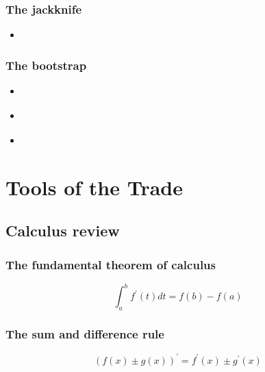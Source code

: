 \documentclass{report}
\begin{document}
\subsection{The jackknife}

\begin{itemize}
    \item \cite[Chapter~30]{dasgupta_asymptotic_2008}
\end{itemize}

\subsection{The bootstrap}

\begin{itemize}
    \item \cite[Chapter~23]{van_der_vaart_asymptotic_1998}
    \item \cite[Chapter~29]{dasgupta_asymptotic_2008}
    \item \cite[Chapter~10.1]{casella_statistical_2002}
\end{itemize}


\chapter{Tools of the Trade} \label{chap:tools-of-the-trade}

\section{Calculus review}\label{sec:tools-calculus}

\subsection{The fundamental theorem of calculus}

\begin{equation}\label{eq:fundamental-theorem-of-calculus}
    \int_a^b f^\prime(t) dt = f(b) - f(a)
\end{equation}

\subsection{The sum and difference rule}

\begin{equation}\label{eq:sum-and-difference-rule}
    (f(x) \pm g(x))^\prime = f^\prime(x) \pm g^\prime(x)
\end{equation}
\end{document}
